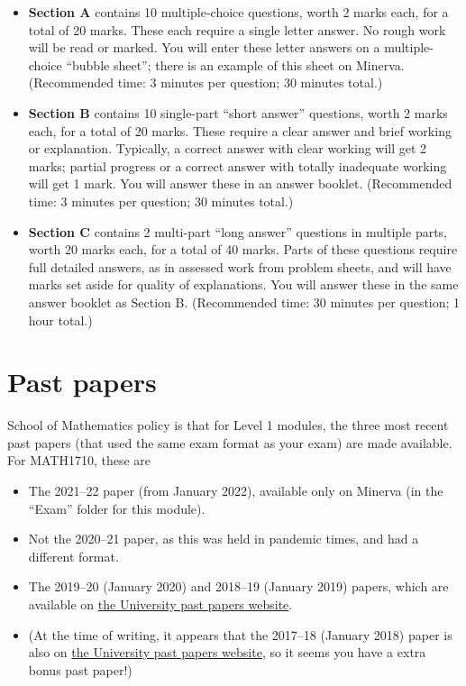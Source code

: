 \documentclass[
  letterpaper,
]{report}
\providecommand{\tightlist}{%
  \setlength{\itemsep}{0pt}\setlength{\parskip}{0pt}}\usepackage{longtable,booktabs,array}
\theoremstyle{definition}
\theoremstyle{definition}
\theoremstyle{remark}
\begin{document}
\begin{itemize}
\tightlist
\item
  \textbf{Section A} contains 10 multiple-choice questions, worth 2
  marks each, for a total of 20 marks. These each require a single
  letter answer. No rough work will be read or marked. You will enter
  these letter answers on a multiple-choice ``bubble sheet''; there is
  an example of this sheet on Minerva. (Recommended time: 3 minutes per
  question; 30 minutes total.)
\item
  \textbf{Section B} contains 10 single-part ``short answer'' questions,
  worth 2 marks each, for a total of 20 marks. These require a clear
  answer and brief working or explanation. Typically, a correct answer
  with clear working will get 2 marks; partial progress or a correct
  answer with totally inadequate working will get 1 mark. You will
  answer these in an answer booklet. (Recommended time: 3 minutes per
  question; 30 minutes total.)
\item
  \textbf{Section C} contains 2 multi-part ``long answer'' questions in
  multiple parts, worth 20 marks each, for a total of 40 marks. Parts of
  these questions require full detailed answers, as in assessed work
  from problem sheets, and will have marks set aside for quality of
  explanations. You will answer these in the same answer booklet as
  Section B. (Recommended time: 30 minutes per question; 1 hour total.)
\end{itemize}

\hypertarget{past-papers}{%
\section{Past papers}\label{past-papers}}

School of Mathematics policy is that for Level 1 modules, the three most
recent past papers (that used the same exam format as your exam) are
made available. For MATH1710, these are

\begin{itemize}
\tightlist
\item
  The 2021--22 paper (from January 2022), available only on Minerva (in
  the ``Exam'' folder for this module).
\item
  Not the 2020--21 paper, as this was held in pandemic times, and had a
  different format.
\item
  The 2019--20 (January 2020) and 2018--19 (January 2019) papers, which
  are available on
  \href{https://students.leeds.ac.uk/exampapers?action=search\&keyword=MATH1710}{the
  University past papers website}.
\item
  (At the time of writing, it appears that the 2017--18 (January 2018)
  paper is also on
  \href{https://students.leeds.ac.uk/exampapers?action=search\&keyword=MATH1710}{the
  University past papers website}, so it seems you have a extra bonus
  past paper!)
\end{itemize}
\end{document}
